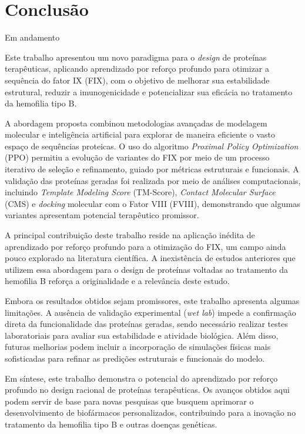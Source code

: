 \chapter{Conclusão}
{\color{red} Em andamento}


Este trabalho apresentou um novo paradigma para o \textit{design} de proteínas terapêuticas,
aplicando aprendizado por reforço profundo para otimizar a sequência do fator IX (FIX),
com o objetivo de melhorar sua estabilidade estrutural, 
reduzir a imunogenicidade e potencializar sua eficácia no tratamento da hemofilia tipo B.  

A abordagem proposta combinou metodologias avançadas de modelagem molecular e inteligência artificial 
para explorar de maneira eficiente o vasto espaço de sequências proteicas. 
O uso do algoritmo \textit{Proximal Policy Optimization} (PPO) permitiu a evolução de variantes do FIX 
por meio de um processo iterativo de seleção e refinamento, 
guiado por métricas estruturais e funcionais. 
A validação das proteínas geradas foi realizada por meio de análises computacionais, 
incluindo \textit{Template Modeling Score} (TM-Score), 
\textit{Contact Molecular Surface} (CMS) e \textit{docking} molecular com o Fator VIII (FVIII), 
demonstrando que algumas variantes apresentam potencial terapêutico promissor.  

A principal contribuição deste trabalho reside na aplicação inédita de aprendizado por reforço profundo
para a otimização do FIX, um campo ainda pouco explorado na literatura científica. 
A inexistência de estudos anteriores que utilizem essa abordagem para o design de proteínas 
voltadas ao tratamento da hemofilia B reforça a originalidade e a relevância deste estudo.  

Embora os resultados obtidos sejam promissores, 
este trabalho apresenta algumas limitações. 
A ausência de validação experimental (\textit{wet lab}) impede a confirmação direta 
da funcionalidade das proteínas geradas, 
sendo necessário realizar testes laboratoriais para avaliar sua estabilidade e atividade biológica. 
Além disso, futuras melhorias podem incluir a incorporação de simulações físicas
mais sofisticadas para refinar as predições estruturais e funcionais do modelo.  

Em síntese, este trabalho demonstra o potencial do aprendizado por reforço profundo no design racional
de proteínas terapêuticas. 
Os avanços obtidos aqui podem servir de base para novas pesquisas que busquem aprimorar o 
desenvolvimento de biofármacos personalizados, 
contribuindo para a inovação no tratamento da hemofilia tipo B e outras doenças genéticas.

